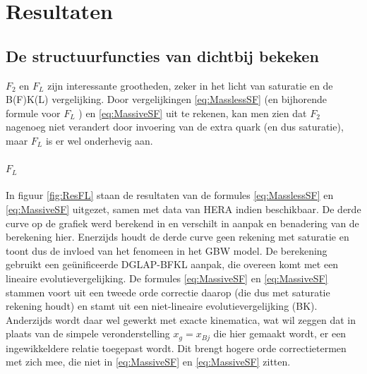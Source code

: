 \documentclass[a4paper,11pt]{article}
\numberwithin{equation}{section} %
\begin{document}
\section{Resultaten}
    \subsection{De structuurfuncties van dichtbij bekeken} \label{sec:ResSF}
$F_2$ en $F_L$ zijn interessante grootheden, zeker in het licht van saturatie en de B(F)K(L) vergelijking.
Door vergelijkingen \eqref{eq:MasslessSF} (en bijhorende formule voor $F_L$ \cite[sectie 9.5.4]{Barone}) en \eqref{eq:MassiveSF} uit te rekenen, kan men zien dat $F_2$ nagenoeg niet verandert door invoering van de extra quark (en dus saturatie), maar $F_L$ is er wel onderhevig aan.

      \paragraph{$F_L$}
In figuur \ref{fig:ResFL} staan de resultaten van de formules \eqref{eq:MasslessSF} en \eqref{eq:MassiveSF} uitgezet, samen met data van HERA \cite{H1} \cite{ZEUS} indien beschikbaar.
De derde curve op de grafiek werd berekend in \cite{Stasto} en verschilt in aanpak en benadering van de berekening hier.
Enerzijds houdt de derde curve geen rekening met saturatie en toont dus de invloed van het fenomeen in het GBW model.
De berekening gebruikt een geünificeerde DGLAP-BFKL aanpak, die overeen komt met een lineaire evolutievergelijking.
De formules \eqref{eq:MassiveSF} en \eqref{eq:MassiveSF} stammen voort uit een tweede orde correctie daarop (die dus met saturatie rekening houdt) en stamt uit een niet-lineaire evolutievergelijking (BK).
Anderzijds wordt daar wel gewerkt met exacte kinematica, wat wil zeggen dat in plaats van de simpele veronderstelling $x_g=x_{Bj}$ die hier gemaakt wordt, er een ingewikkeldere relatie toegepast wordt.
Dit brengt hogere orde correctietermen met zich mee, die niet in \eqref{eq:MassiveSF} en \eqref{eq:MassiveSF} zitten.
\end{document}
